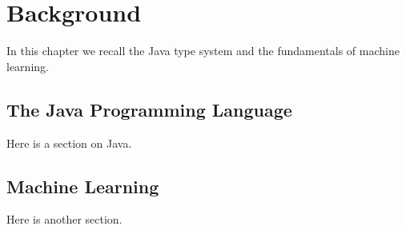 \chapter{Background}
\label{chap:background}

In this chapter we recall the Java type system and the fundamentals of
machine learning.

\section{The Java Programming Language}

Here is a section on Java.

\section{Machine Learning}

Here is another section.
